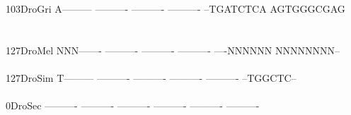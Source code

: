 \documentclass[11pt,twoside,reqno,a4paper]{article}
\begin{document}
{103\hspace*{1\charwidth}DroGri	A---------	----------	----------	----------	--TGATCTCA	AGTGGGCGAG	\\
\hspace*{4\charwidth}\hspace*{7\charwidth}\hspace*{1\charwidth}\hspace*{1\charwidth}\hspace*{1\charwidth}\hspace*{1\charwidth}\hspace*{1\charwidth}\hspace*{1\charwidth}\\
\\
127\hspace*{1\charwidth}DroMel	NNN-------	----------	----------	----------	----NNNNNN	NNNNNNNN--	\\
\hspace*{4\charwidth}\hspace*{7\charwidth}\hspace*{1\charwidth}\hspace*{1\charwidth}\hspace*{1\charwidth}\hspace*{1\charwidth}\hspace*{1\charwidth}\hspace*{1\charwidth}\\
127\hspace*{1\charwidth}DroSim	T---------	----------	----------	----------	----------	--TGGCTC--	\\
\hspace*{4\charwidth}\hspace*{7\charwidth}\hspace*{1\charwidth}\hspace*{1\charwidth}\hspace*{1\charwidth}\hspace*{1\charwidth}\hspace*{1\charwidth}\hspace*{1\charwidth}\\
0\hspace*{3\charwidth}DroSec	----------	----------	----------	----------	----------	----------	\\
\hspace*{4\charwidth}\hspace*{7\charwidth}\hspace*{1\charwidth}\hspace*{1\charwidth}\hspace*{1\charwidth}\hspace*{1\charwidth}\hspace*{1\charwidth}\hspace*{1\charwidth}\\
}
\end{document}
